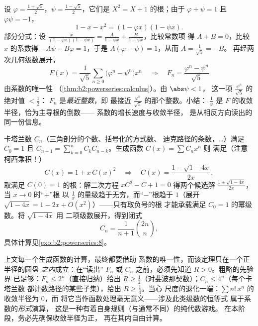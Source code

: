 \begin{example}[比内公式的具体计算]\label{ex:b2:powerseries:binet}
设 $\varphi = \frac{1+\sqrt5}{2}$，$\psi =
\frac{1-\sqrt5}{2}$，它们是 $X^2 = X + 1$ 的根；由于 $\varphi
+ \psi = 1$ 且 $\varphi\psi = -1$，
\[
1 - x - x^2 = (1 - \varphi x)(1 - \psi x) .
\]
部分分式：设 $\frac{x}{(1-\varphi x)(1-\psi x)} =
\frac{A}{1 - \varphi x} + \frac{B}{1 - \psi x}$，比较常数项
得 $A + B = 0$，比较 $x$ 的系数得 $-A\psi - B\varphi
= 1$，于是 $A(\varphi - \psi) = 1$，从而 $A = \frac{1}{\sqrt5} = -B$。
再经两次几何级数展开，
\[
F(x) = \frac{1}{\sqrt5}\sum_{n\geq0}
\bigl(\varphi^n - \psi^n\bigr)x^n
\quad\Longrightarrow\quad
F_n = \frac{\varphi^n - \psi^n}{\sqrt5}
\]
由系数的唯一性
（\cref{thm:b2:powerseries:calculus}）。由 $\abs\psi < 1$，
这一项 $\frac{\psi^n}{\sqrt5}$ 的绝对值 $< \frac12$：
$F_n$ 是\emph{最近整数}，即
最接近 $\frac{\varphi^n}{\sqrt5}$ 的那个整数。小结：
$\frac1\varphi$ 是 $F$ 的收敛半径，恰为主导根的倒数——
系数的增长速度与收敛半径，
是从相反方向读出的同一份信息。
\end{example}

\begin{example}[卡塔兰数]\label{ex:b2:powerseries:catalan}
卡塔兰数 $C_n$（三角剖分的个数、括号化的方式数、
迪克路径的条数，\dots）满足 $C_0 = 1$ 且 $C_{n+1} = \sum_{k=0}^n
C_kC_{n-k}$。生成函数 $C(x) = \sum C_nx^n$ 则
满足（注意柯西乘积！）
\[
C(x) = 1 + x\,C(x)^2
\quad\Longrightarrow\quad
C(x) = \frac{1 - \sqrt{1 - 4x}}{2x} ,
\]
取满足 $C(0) = 1$ 的根：解二次方程
$xC^2 - C + 1 = 0$ 得两个候选解 $\frac{1 \pm
\sqrt{1-4x}}{2x}$，当 $x \to 0$ 时“$+$”根
以 $\frac1x$ 的量级趋于无穷，而“$-$”根趋于 $1$（展开
$\sqrt{1-4x} = 1 - 2x + O(x^2)$）——只有取负号的根
才能承载满足 $C_0 = 1$ 的幂级数。将 $\sqrt{1 - 4x}$ 用
二项级数展开，得到闭式
\[
C_n = \frac{1}{n+1}\binom{2n}{n} ,
\]
具体计算见\cref{exo:b2:powerseries:8}。
\end{example}

\begin{remark}[形式级数与收敛级数]
上文每一个生成函数的计算，最终都要借助
系数的唯一性，而该定理只在一个正半径的圆盘
\emph{之内}成立：在“读出”
$F_n$ 或 $C_n$ 之前，必须先知道 $R > 0$。粗略的先验界
已足够：$F_n \leq 2^n$（直接归纳）给出 $R \geq
\frac12$（对斐波那契数）；$C_n \leq 4^n$（每个卡塔兰数
都计数路径的某些子集），给出 $R \geq \frac14$。当心
尺度的退化一端：$\sum n!\,x^n$ 的收敛半径为 $0$，而
将它当作函数处理毫无意义——涉及此类级数的恒等式
属于系数的\emph{形式}演算，
这是一种有着自身规则（与通常不同）的纯代数游戏。
在本阶段，务必先确保收敛半径为正，
再在其内自由计算。
\end{remark}

